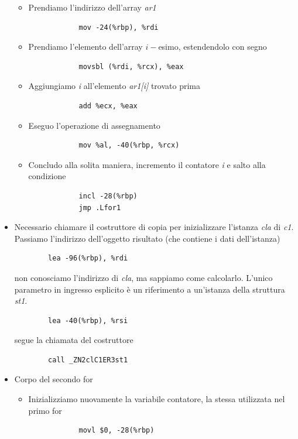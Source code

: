 \begin{itemize}
\begin{itemize}
		\item Prendiamo l'indirizzo dell'array \emph{ar1}
		\begin{verbatim}
			mov -24(%rbp), %rdi
		\end{verbatim}
		\item Prendiamo l'elemento dell'array $i-$esimo, estendendolo con segno
		\begin{verbatim}
			movsbl (%rdi, %rcx), %eax
		\end{verbatim}
		\item Aggiungiamo \emph{i} all'elemento \emph{ar1[i]} trovato prima
		\begin{verbatim}
			add %ecx, %eax
		\end{verbatim}
		\item Eseguo l'operazione di assegnamento
		\begin{verbatim}
			mov %al, -40(%rbp, %rcx)
		\end{verbatim}
		\item Concludo alla solita maniera, incremento il contatore \emph{i} e salto alla condizione
		\begin{verbatim}
			incl -28(%rbp)
			jmp .Lfor1
		\end{verbatim}
	\end{itemize}
	\item Necessario chiamare il costruttore di copia per inizializzare l'istanza \emph{cla} di \emph{c1}. Passiamo l'indirizzo dell'oggetto risultato (che contiene i dati dell'istanza)
	\begin{verbatim}
		lea -96(%rbp), %rdi
	\end{verbatim}
	non conosciamo l'indirizzo di \emph{cla}, ma sappiamo come calcolarlo.  L'unico parametro in ingresso esplicito è un riferimento a un'istanza della struttura \emph{st1}.
	\begin{verbatim}
		lea -40(%rbp), %rsi
	\end{verbatim}
	segue la chiamata del costruttore
	\begin{verbatim}
		call _ZN2clC1ER3st1
	\end{verbatim}
	\item Corpo del secondo for
	\begin{itemize}
		\item Inizializziamo nuovamente la variabile contatore, la stessa utilizzata nel primo for
		\begin{verbatim}
			movl $0, -28(%rbp)
		\end{verbatim}
\end{itemize}
\end{itemize}
